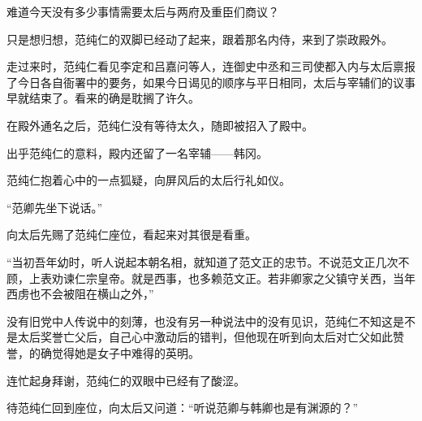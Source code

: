 难道今天没有多少事情需要太后与两府及重臣们商议？

只是想归想，范纯仁的双脚已经动了起来，跟着那名内侍，来到了崇政殿外。

走过来时，范纯仁看见李定和吕嘉问等人，连御史中丞和三司使都入内与太后禀报了今日各自衙署中的要务，如果今日谒见的顺序与平日相同，太后与宰辅们的议事早就结束了。看来的确是耽搁了许久。

在殿外通名之后，范纯仁没有等待太久，随即被招入了殿中。

出乎范纯仁的意料，殿内还留了一名宰辅——韩冈。

范纯仁抱着心中的一点狐疑，向屏风后的太后行礼如仪。

“范卿先坐下说话。”

向太后先赐了范纯仁座位，看起来对其很是看重。

“当初吾年幼时，听人说起本朝名相，就知道了范文正的忠节。不说范文正几次不顾，上表劝谏仁宗皇帝。就是西事，也多赖范文正。若非卿家之父镇守关西，当年西虏也不会被阻在横山之外，”

没有旧党中人传说中的刻薄，也没有另一种说法中的没有见识，范纯仁不知这是不是太后奖誉亡父后，自己心中激动后的错判，但他现在听到向太后对亡父如此赞誉，的确觉得她是女子中难得的英明。

连忙起身拜谢，范纯仁的双眼中已经有了酸涩。

待范纯仁回到座位，向太后又问道：“听说范卿与韩卿也是有渊源的？”

